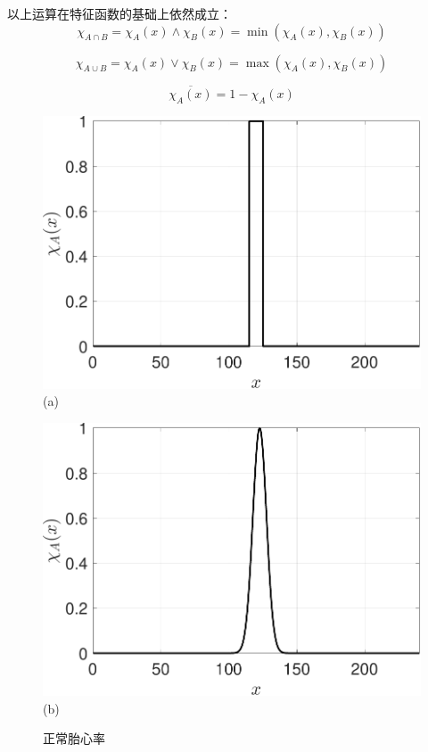 以上运算在特征函数的基础上依然成立：
\begin{equation}
    \chi_{A \cap B}=\chi_{A}(x) \wedge \chi_{B}(x)=\min \left(\chi_{A}(x), \chi_{B}(x)\right) 
\end{equation}

\begin{equation}
    \chi_{A \cup B}=\chi_{A}(x) \vee \chi_{B}(x)=\max \left(\chi_{A}(x), \chi_{B}(x)\right) 
\end{equation}

\begin{equation}
\overline{\chi_{A}(x)}=1-\chi_{A}(x)
\end{equation}

\begin{figure}[htbp]
    \centering
    \begin{minipage}[t]{0.48\textwidth}
    \centering
    {\includegraphics[width = \linewidth]{ch01/fig/heart-120.pdf}}\\ (a)
    \end{minipage}
    \hfill 
   \begin{minipage}[t]{0.48\textwidth}
    \centering
    {\includegraphics[width = \linewidth]{ch01/fig/heart-fuzzy.pdf}}\\ (b)
    \end{minipage}
    \caption{正常胎心率}
    \end{figure}
